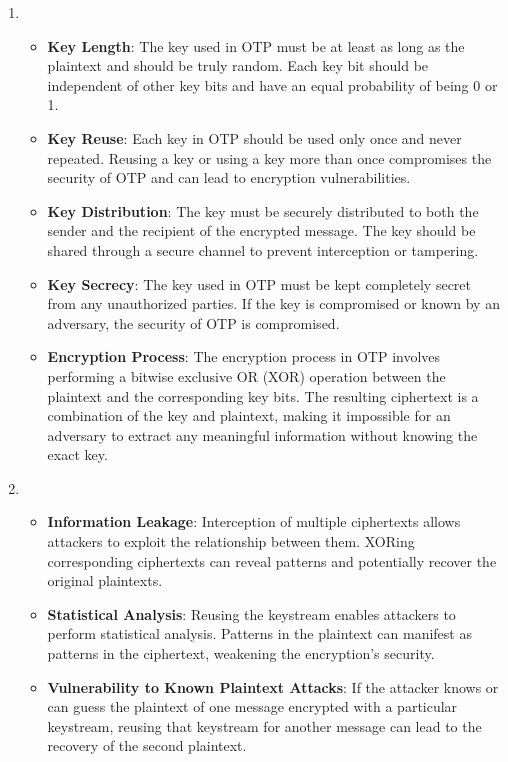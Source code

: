 {\begin{enumerate}
		\item \begin{itemize}
			\item \textbf{Key Length}: The key used in OTP must be at least as long as the plaintext and should be truly random. Each key bit should be independent of other key bits and have an equal probability of being 0 or 1.
			
			\item \textbf{Key Reuse}: Each key in OTP should be used only once and never repeated. Reusing a key or using a key more than once compromises the security of OTP and can lead to encryption vulnerabilities.
			
			\item \textbf{Key Distribution}: The key must be securely distributed to both the sender and the recipient of the encrypted message. The key should be shared through a secure channel to prevent interception or tampering.
			
			\item \textbf{Key Secrecy}: The key used in OTP must be kept completely secret from any unauthorized parties. If the key is compromised or known by an adversary, the security of OTP is compromised.
			
			\item \textbf{Encryption Process}: The encryption process in OTP involves performing a bitwise exclusive OR (XOR) operation between the plaintext and the corresponding key bits. The resulting ciphertext is a combination of the key and plaintext, making it impossible for an adversary to extract any meaningful information without knowing the exact key.
		\end{itemize}
	
		\item \begin{itemize}
			\item \textbf{Information Leakage}: Interception of multiple ciphertexts allows attackers to exploit the relationship between them. XORing corresponding ciphertexts can reveal patterns and potentially recover the original plaintexts.
			
			\item \textbf{Statistical Analysis}: Reusing the keystream enables attackers to perform statistical analysis. Patterns in the plaintext can manifest as patterns in the ciphertext, weakening the encryption's security.
			
			\item \textbf{Vulnerability to Known Plaintext Attacks}: If the attacker knows or can guess the plaintext of one message encrypted with a particular keystream, reusing that keystream for another message can lead to the recovery of the second plaintext.
			

\end{itemize}
\end{enumerate}}
